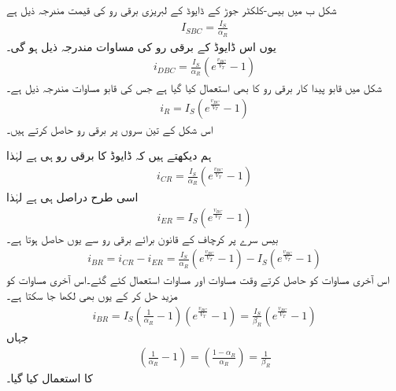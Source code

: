 شکل  ب میں بیس-کلکٹر جوڑ کے ڈایوڈ کے لبریزی برقی رو کی قیمت مندرجہ ذیل ہے
\begin{align}
I_{SBC}=\frac{I_S}{\alpha_R}
\end{align}
یوں اس ڈایوڈ کے برقی رو کی مساوات مندرجہ ذیل ہو گی۔
\begin{align}
i_{DBC}=\frac{I_S}{\alpha_R} \left(e^{\frac{v_{BC}}{V_T}}-1 \right )
\end{align}
شکل میں قابو پیدا کار برقی رو   کا بھی استعمال کیا گیا ہے جس کی قابو مساوات مندرجہ ذیل ہے۔
\begin{align}
i_R = I_S \left (e^{\frac{v_{BC}}{V_T}}-1 \right )
\end{align}
اس شکل کے تین سروں پر برقی رو حاصل کرتے ہیں۔

ہم دیکھتے ہیں کہ ڈایوڈ کا برقی رو ہی  ہے لہٰذا
\begin{align} \label{مساوات_ٹرانزسٹر_کلکٹر _الٹی_رو}
i_{CR}=\frac{I_S}{\alpha_R} \left (e^{\frac{v_{BC}}{V_T}}-1 \right )
\end{align}
اسی طرح   دراصل  ہی ہے لہٰذا
\begin{align} \label{مساوات_ٹرانزسٹر_مخارج_الٹی_رو}
i_{ER}=I_S \left (e^{\frac{v_{BC}}{V_T}}-1 \right )
\end{align}
بیس سرے پر کرچاف کے قانون برائے برقی رو سے  یوں حاصل ہوتا ہے۔
\begin{align} \label{مساوات_ٹرانزسٹر_قابو_الٹی_رو_الف}
i_{BR}=i_{CR}-i_{ER}=\frac{I_S}{\alpha_R} \left (e^{\frac{v_{BC}}{V_T}}-1 \right )-I_S \left (e^{\frac{v_{BC}}{V_T}}-1 \right )
\end{align}
اس آخری مساوات کو حاصل کرتے وقت مساوات   اور مساوات   استعمال کئے گئے۔اس آخری مساوات کو مزید حل کر کے یوں بھی لکھا جا سکتا ہے۔
\begin{align}
i_{BR}=I_S \left (\frac{1}{\alpha_R}-1 \right ) \left (e^{\frac{v_{BC}}{V_T}}-1 \right )=\frac{I_S}{\beta_R} \left (e^{\frac{v_{BC}}{V_T}}-1 \right )
\end{align}
جہاں
\begin{align}
\left (\frac{1}{\alpha_R}-1 \right )=\left (\frac{1-\alpha_R}{\alpha_R} \right )=\frac{1}{\beta_R}
\end{align}
کا استعمال کیا گیا۔

